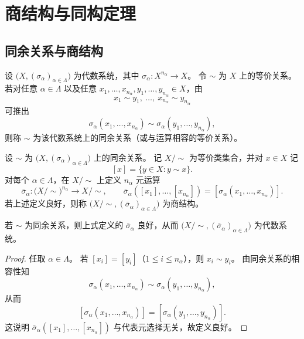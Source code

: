 \documentclass[lang=cn,a4paper,newtx]{elegantbook}
\begin{document}
\chapter{商结构与同构定理}

\section{同余关系与商结构}

\begin{definition}[同余关系]
设 $\bigl(X,(\sigma_{\alpha})_{\alpha\in\Lambda}\bigr)$ 为代数系统，其中 $\sigma_{\alpha}:X^{n_{\alpha}}\to X$。
令 $\sim$ 为 $X$ 上的等价关系。
若对任意 $\alpha\in\Lambda$ 以及任意 $x_1,\dots,x_{n_{\alpha}},y_1,\dots,y_{n_{\alpha}}\in X$，由
\[
  x_1\sim y_1,\ \dots,\ x_{n_{\alpha}}\sim y_{n_{\alpha}}
\]
可推出
\[
  \sigma_{\alpha}(x_1,\dots,x_{n_{\alpha}})\sim \sigma_{\alpha}(y_1,\dots,y_{n_{\alpha}}),
\]
则称 $\sim$ 为该代数系统上的同余关系（或与运算相容的等价关系）。
\end{definition}

\begin{definition}[商结构]
设 $\sim$ 为 $\bigl(X,(\sigma_{\alpha})_{\alpha\in\Lambda}\bigr)$ 上的同余关系。
记 $X/\!\sim$ 为等价类集合，并对 $x\in X$ 记
\[
  [x]=\{y\in X: y\sim x\}.
\]
对每个 $\alpha\in\Lambda$，在 $X/\!\sim$ 上定义 $n_{\alpha}$ 元运算
\[
  \bar{\sigma}_{\alpha}:\bigl(X/\!\sim\bigr)^{n_{\alpha}}\to X/\!\sim,\qquad \bar{\sigma}_{\alpha}([x_1],\dots,[x_{n_{\alpha}}])=[\sigma_{\alpha}(x_1,\dots,x_{n_{\alpha}})].
\]
若上述定义良好，则称 $\bigl(X/\!\sim,(\bar{\sigma}_{\alpha})_{\alpha\in\Lambda}\bigr)$ 为商结构。
\end{definition}

\begin{proposition}
若 $\sim$ 为同余关系，则上式定义的 $\bar{\sigma}_{\alpha}$ 良好，从而 $\bigl(X/\!\sim,(\bar{\sigma}_{\alpha})_{\alpha\in\Lambda}\bigr)$ 为代数系统。
\end{proposition}

\begin{proof}
任取 $\alpha\in\Lambda$。
若 $[x_i]=[y_i]$（$1\le i\le n_{\alpha}$），则 $x_i\sim y_i$。
由同余关系的相容性知
\[
  \sigma_{\alpha}(x_1,\dots,x_{n_{\alpha}})\sim \sigma_{\alpha}(y_1,\dots,y_{n_{\alpha}}),
\]
从而
\[
  [\sigma_{\alpha}(x_1,\dots,x_{n_{\alpha}})]=[\sigma_{\alpha}(y_1,\dots,y_{n_{\alpha}})].
\]
这说明 $\bar{\sigma}_{\alpha}([x_1],\dots,[x_{n_{\alpha}}])$ 与代表元选择无关，故定义良好。
\end{proof}
\end{document}

